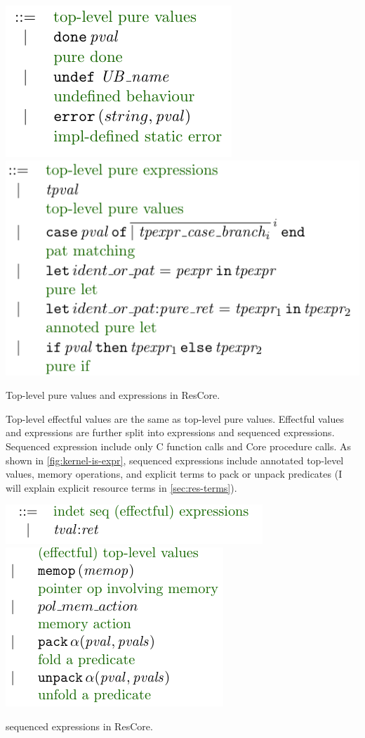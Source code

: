 \begin{marginfigure}
    \includegraphics{figures/kernel-tpval}
    \includegraphics{figures/kernel-tpexpr}
    \caption{Top-level pure values and expressions in ResCore.}\label{fig:kernel-tp}
\end{marginfigure}

Top-level effectful values are the same as top-level pure values.
Effectful values and expressions are further split into 
expressions and  sequenced expressions. Sequenced
expression include only C function calls and Core procedure calls.
As shown in \cref{fig:kernel-is-expr},  sequenced
expressions include annotated top-level values, memory operations, and explicit
terms to pack or unpack predicates (I will explain explicit resource terms in
\cref{sec:res-terms}).

\begin{marginfigure}
    \includegraphics{figures/kernel-is-expr-1}
    \includegraphics{figures/kernel-is-expr-2}
    \caption{ sequenced expressions in ResCore.}\label{fig:kernel-is-expr}
\end{marginfigure}


